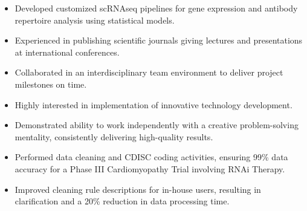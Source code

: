 

\begin{itemize}
    \item Developed customized scRNAseq pipelines for gene expression and antibody repertoire analysis using statistical models.
    \item Experienced in publishing scientific journals giving lectures and presentations at international conferences. 
    \item Collaborated in an interdisciplinary team environment to deliver project milestones on time.
    \item Highly interested in implementation of innovative technology development. 
    \item Demonstrated ability to work independently with a creative problem-solving mentality, consistently delivering high-quality results.
\end{itemize}




\begin{itemize}
    \setlength{\itemindent}{0.5em}
    \item \small 
    Performed data cleaning and CDISC coding activities, ensuring 99\% data accuracy for a Phase III Cardiomyopathy Trial involving RNAi Therapy. 
    \item 
    Improved cleaning rule descriptions for in-house users, resulting in clarification and a 20\% reduction in data processing time.
\end{itemize}
\smallskip




